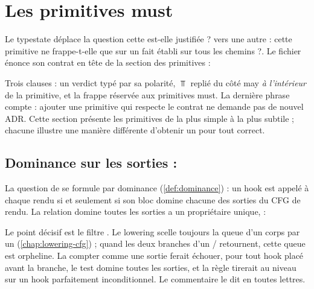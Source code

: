 \section{Les primitives must}
\label{sec:api-regles-primitives}

Le typestate déplace la question \og cette \Error{} est-elle justifiée ?\fg{} vers une autre : \og cette primitive ne frappe-t-elle que sur un fait établi sur tous les chemins ?\fg. Le fichier  énonce son contrat en tête de la section des primitives :


Trois clauses : un verdict typé par sa polarité, $\Top$ replié du côté may \emph{à l'intérieur} de la primitive, et la frappe réservée aux primitives must. La dernière phrase compte : ajouter une primitive qui respecte le contrat ne demande pas de nouvel ADR. Cette section présente les primitives de la plus simple à la plus subtile ; chacune illustre une manière différente d'obtenir un \og pour tout\fg{} correct.

\subsection{Dominance sur les sorties : }
\label{sec:api-regles-dominance}

La question de  se formule par dominance (\cref{def:dominance}) : un hook est appelé à chaque rendu si et seulement si son bloc domine chacune des sorties du CFG de rendu. La relation \og domine toutes les sorties\fg{} a un propriétaire unique,  :


Le point décisif est le filtre . Le lowering scelle toujours la queue d'un corps par un  (\cref{chap:lowering-cfg}) ; quand les deux branches d'un / retournent, cette queue est orpheline. La compter comme une sortie ferait échouer, pour tout hook placé avant la branche, le test \og domine toutes les sorties\fg, et la règle tirerait au niveau \Error{} sur un hook parfaitement inconditionnel. Le commentaire le dit en toutes lettres.

